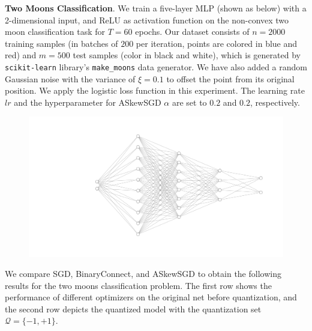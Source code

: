 \documentclass[10pt,a4paper]{article}
\begin{document}
\textbf{Two Moons Classification}. We train a five-layer MLP (shown as below) with a 2-dimensional input, and ReLU as activation function on the non-convex two moon classification task for $T=60$ epochs. Our dataset consists of $n=2000$ training samples (in batches of $200$ per iteration, points are colored in blue and red) and $m=500$ test samples (color in black and white), which is generated by \texttt{scikit-learn} library's \texttt{make\_moons} data generator. We have also added a random Gaussian noise with the variance of $\xi=0.1$ to offset the point from its original position. We apply the logistic loss function in this experiment. The learning rate $lr$ and the hyperparameter for ASkewSGD $\alpha$ are set to $0.2$ and $0.2$, respectively.
\begin{figure}[H]
  \centering
  \includegraphics[width=0.6\linewidth]{nn.png}
\end{figure}

We compare SGD, BinaryConnect, and ASkewSGD to obtain the following results for the two moons classification problem. The first row shows the performance of different optimizers on the original net before quantization, and the second row depicts the quantized model with the quantization set $\mathcal{Q}=\{-1,+1\}$.
\end{document}
